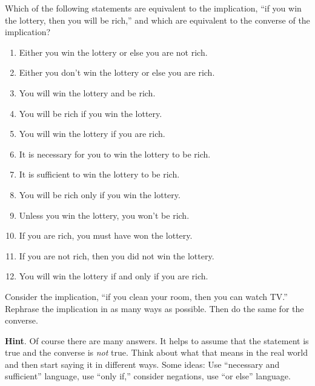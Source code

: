 \documentclass[11pt,]{book}
\theoremstyle{ptxplainnotitle}
\theoremstyle{ptxplaintitle}
\theoremstyle{ptxdefinitionnotitle}
\theoremstyle{ptxdefinitiontitle}
\theoremstyle{ptxdefinitionnotitle}
\theoremstyle{ptxdefinitiontitle}
\theoremstyle{ptxdefinitionnotitle}
\theoremstyle{ptxdefinitiontitle}
\theoremstyle{ptxdefinitiontitlenonumber}
\theoremstyle{ptxdefinitiontitlenonumber}
\numberwithin{equation}{chapter}
\begin{document}
\begin{divisionexercise}{10}\hypertarget{exercise-159}{}
\hypertarget{p-2122}{}%
Which of the following statements are equivalent to the implication, ``if you win the lottery, then you will be rich,'' and which are equivalent to the converse of the implication? \leavevmode%
\begin{enumerate}[label=(\alph*)]
\item\hypertarget{li-1056}{}\hypertarget{p-2123}{}%
Either you win the lottery or else you are not rich.%
\item\hypertarget{li-1057}{}\hypertarget{p-2124}{}%
Either you don't win the lottery or else you are rich.%
\item\hypertarget{li-1058}{}\hypertarget{p-2125}{}%
You will win the lottery and be rich.%
\item\hypertarget{li-1059}{}\hypertarget{p-2126}{}%
You will be rich if you win the lottery.%
\item\hypertarget{li-1060}{}\hypertarget{p-2127}{}%
You will win the lottery if you are rich.%
\item\hypertarget{li-1061}{}\hypertarget{p-2128}{}%
It is necessary for you to win the lottery to be rich.%
\item\hypertarget{li-1062}{}\hypertarget{p-2129}{}%
It is sufficient to win the lottery to be rich.%
\item\hypertarget{li-1063}{}\hypertarget{p-2130}{}%
You will be rich only if you win the lottery.%
\item\hypertarget{li-1064}{}\hypertarget{p-2131}{}%
Unless you win the lottery, you won't be rich.%
\item\hypertarget{li-1065}{}\hypertarget{p-2132}{}%
If you are rich, you must have won the lottery.%
\item\hypertarget{li-1066}{}\hypertarget{p-2133}{}%
If you are not rich, then you did not win the lottery.%
\item\hypertarget{li-1067}{}\hypertarget{p-2134}{}%
You will win the lottery if and only if you are rich.%
\end{enumerate}
%
\end{divisionexercise}%
\begin{divisionexercise}{11}\hypertarget{exercise-160}{}
\hypertarget{p-2148}{}%
Consider the implication, ``if you clean your room, then you can watch TV.'' Rephrase the implication in as many ways as possible. Then do the same for the converse.%
\par\smallskip%
\noindent\textbf{Hint}.\hypertarget{hint-14}{}\quad%
\hypertarget{p-2149}{}%
Of course there are many answers. It helps to assume that the statement is true and the converse is \emph{not} true. Think about what that means in the real world and then start saying it in different ways. Some ideas: Use ``necessary and sufficient'' language, use ``only if,'' consider negations, use ``or else'' language.%
\end{divisionexercise}%
\typeout{************************************************}
\typeout{************************************************}
\end{document}
